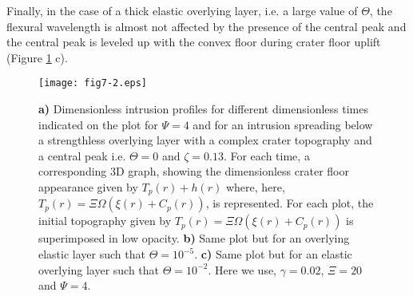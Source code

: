 Finally, in the case of a  thick elastic overlying layer, i.e. a large
value of $\Theta$,  the flexural wavelength is almost  not affected by
the presence  of the central peak  and the central peak  is leveled up
with   the   convex  floor   during   crater   floor  uplift   (Figure
\ref{C5-fig7-2} c).
\begin{figure}[h!]
  \begin{center}
    \graphicspath{{/Users/thorey/Documents/These/Submission/Article/FFC_JGR_2013/Paper_APRES_2nd_REVIEW/}}
    \texttt{[image: fig7-2.eps]}
    \caption{   \textbf{a)}  Dimensionless   intrusion  profiles   for
      different dimensionless times indicated on the plot for $\Psi=4$
      and for  an intrusion  spreading below a  strengthless overlying
      layer  with  a complex  crater  topography  and a  central  peak
      i.e. $\Theta=0$ and $\zeta=0.13$. For each time, a corresponding
      3D  graph, showing  the  dimensionless  crater floor  appearance
      given        by         $T_p(r)+h(r)$        where,        here,
      $T_p(r)=\Xi  \Omega(\xi(r)+C_p(r))$,  is represented.  For  each
      plot,      the       initial      topography       given      by
      $T_p(r)=\Xi  \Omega(\xi(r)+C_p(r))$   is  superimposed   in  low
      opacity.  \textbf{b)} Same  plot  but for  an overlying  elastic
      layer such that $\Theta=10^{-5}$.  \textbf{c)} Same plot but for
      an elastic  overlying layer such that  $\Theta=10^{-2}$. Here we
      use, $\gamma=0.02$, $\Xi=20$ and $\Psi=4$.}
    \label{C5-fig7-2}
  \end{center}
\end{figure}


